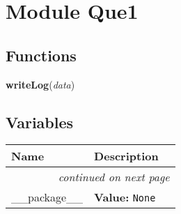 %
%
%


\section{Module Que1}

    \label{Que1}


  \subsection{Functions}

    \label{Que1:writeLog}

    \vspace{0.5ex}

\hspace{.8\funcindent}\begin{boxedminipage}{\funcwidth}

    \raggedright \textbf{writeLog}(\textit{data})

\setlength{\parskip}{2ex}
\setlength{\parskip}{1ex}
    \end{boxedminipage}



  \subsection{Variables}

    \vspace{-1cm}
\hspace{\varindent}\begin{longtable}{|p{\varnamewidth}|p{\vardescrwidth}|l}
\cline{1-2}
\cline{1-2} \centering \textbf{Name} & \centering \textbf{Description}& \\
\cline{1-2}
\endhead\cline{1-2}\multicolumn{3}{r}{\small\textit{continued on next page}}\\\endfoot\cline{1-2}
\endlastfoot\raggedright \_\-\_\-p\-a\-c\-k\-a\-g\-e\-\_\-\_\- & \raggedright \textbf{Value:} 
{\tt None}&\\
\cline{1-2}
\end{longtable}


